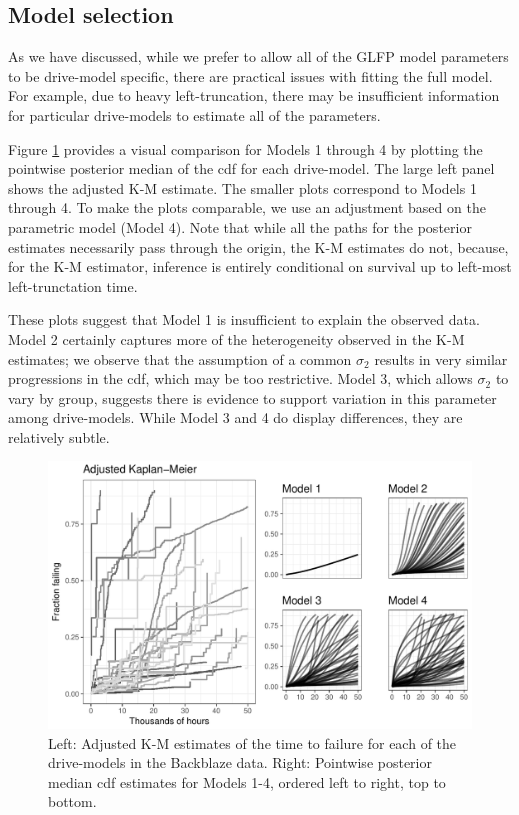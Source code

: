 \documentclass[12pt]{article}
\begin{document}
\subsection{Model selection}
\label{sec:Model Comparisons}
As we have discussed, while we prefer to allow all of the GLFP model parameters to be drive-model specific, there are practical issues with fitting the full model. For example, due to heavy left-truncation, there may be insufficient information for particular drive-models to estimate all of the parameters. 

Figure \ref{fig:fig2} provides a visual comparison for Models 1 through 4 by plotting the pointwise posterior median of the cdf for each drive-model.  The large left panel shows the adjusted K-M estimate.  The smaller plots correspond to Models 1 through 4.  To make the plots comparable, we use an adjustment based on the parametric model (Model 4).  Note that while all the paths for the posterior estimates necessarily pass through the origin, the K-M estimates do not, because, for the K-M estimator, inference is entirely conditional on survival up to left-most left-trunctation time.

These plots suggest that Model 1 is insufficient to explain the observed data. Model 2 certainly captures more of the heterogeneity observed in the K-M estimates; we observe that the assumption of a common $\sigma_2$ results in very similar progressions in the cdf, which may be too restrictive. Model 3, which allows $\sigma_2$ to vary by group, suggests there is evidence to support variation in this parameter among drive-models. While Model 3 and 4 do display differences, they are relatively subtle.

\begin{figure}[H]
\includegraphics[width=\textwidth]{heterogeneity-compare}
\caption{Left: Adjusted K-M estimates of the time to failure for each of the drive-models in the Backblaze data. Right: Pointwise posterior median cdf estimates for Models 1-4, ordered left to right, top to bottom.}
\label{fig:fig2}
\end{figure}
\end{document}
